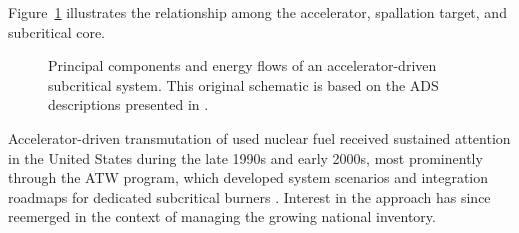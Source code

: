 Figure~\ref{fig:ads-components} illustrates the relationship among the
accelerator, spallation target, and subcritical core.

\begin{figure}[htbp]
    \centering

    \caption{Principal components and energy flows of an
    accelerator-driven subcritical system. This original schematic is based
    on the \gls{ADS} descriptions presented in
    \cite{aitabderrahim_myrrha_2001,nea_ads_components_2010}.}
    \label{fig:ads-components}
\end{figure}

Accelerator-driven transmutation of used nuclear fuel received sustained
attention in the United States during the late 1990s and early 2000s, most
prominently through the \gls{ATW} program,
which developed system scenarios and integration roadmaps for dedicated
subcritical burners \cite{vantuyleRoadmapDevelopingATW2001}. Interest in the approach has
since reemerged in the context of managing the growing national
inventory.

